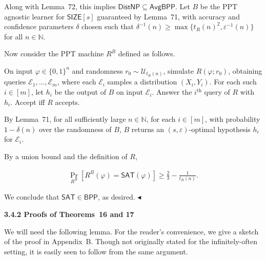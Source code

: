 \documentclass[10pt,a4paper]{article}
\begin{document}
Along with Lemma 72, this implies ${\mathsf{Dist}}{\mathsf{NP}}\subseteq{\mathsf{Avg}}{\mathsf{BPP}}$. Let $B$ be the PPT agnostic learner for ${\mathsf{SIZE}}[s]$ guaranteed by Lemma 71, with accuracy and confidence parameters $\delta$ chosen such that $\delta^{-1}(n)\geq\max\{t_{R}(n)^{2},\varepsilon^{-1}(n)\}$ for all $n\in\mathbb{N}$.\par




Now consider the PPT machine $R^{B}$ defined as follows.\par



On input $\varphi\in\{0,1\}^{n}$ and randomness $r_{0}\sim\mathcal{U}_{t_{R}(n)}$, simulate $R(\varphi;r_{0})$, obtaining queries $\mathcal{E}_{1},...,\mathcal{E}_{m}$, where each $\mathcal{E}_{i}$ samples a distribution $(X_{i},Y_{i})$. For each such $i\in[m]$, let $h_{i}$ be the output of $B$ on input $\mathcal{E}_{i}$. Answer the $i^{\text{th}}$ query of $R$ with $h_{i}$. Accept iff $R$ accepts.\par



By Lemma 71, for all sufficiently large $n\in\mathbb{N}$, for each $i\in[m]$, with probability $1-\delta(n)$ over the randomness of $B$, $B$ returns an $(s,\varepsilon)$-optimal hypothesis $h_{i}$ for $\mathcal{E}_{i}$.\par




By a union bound and the definition of $R$,\par


\[\begin{gathered}
\Pr_{R^{B}}[R^{B}(\varphi)={\mathsf{SAT}}(\varphi)]\geq\frac{2}{3}-\frac{1}{t_{R}(n)}.
\end{gathered}\]


We conclude that ${\mathsf{SAT}}\in{\mathsf{BPP}}$, as desired.
$\blacktriangleleft$\par






\par\medskip\noindent\textbf{
3.4.2 Proofs of Theorems 16 and 17
}\par




We will need the following lemma. For the reader’s convenience, we give a sketch of the proof in Appendix B. Though not originally stated for the infinitely-often setting, it is easily seen to follow from the same argument.\par
\end{document}
